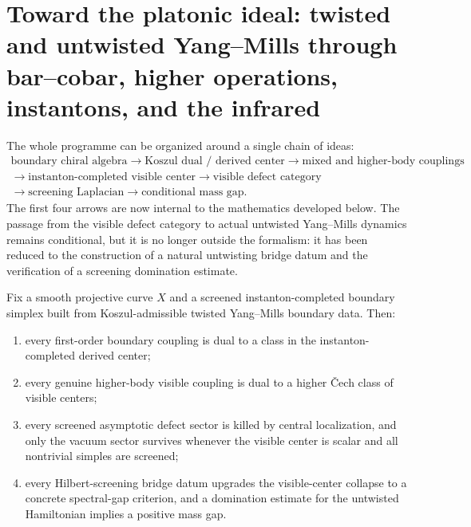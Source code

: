 \providecommand{\cH}{\mathcal{H}}
\providecommand{\cB}{\mathcal{B}}
\providecommand{\Barch}{\overline{B}^{\mathrm{ch}}}

\section{Toward the platonic ideal: twisted and untwisted Yang--Mills through bar--cobar, higher operations, instantons, and the infrared}
\label{sec:ym-instanton-ir-frontier}
\label{sec:ym-platonic-ideal-synthesis}

\begin{summary}
The whole programme can be organized around a single chain of ideas:
\begin{gather*}
\text{boundary chiral algebra}
\longrightarrow
\text{Koszul dual / derived center}
\longrightarrow
\text{mixed and higher-body couplings}\\
\longrightarrow
\text{instanton-completed visible center}
\longrightarrow
\text{visible defect category}\\
\longrightarrow
\text{screening Laplacian}
\longrightarrow
\text{conditional mass gap}.
\end{gather*}
The first four arrows are now internal to the mathematics developed below.
The passage from the visible defect category to actual untwisted Yang--Mills dynamics remains conditional,
but it is no longer outside the formalism: it has been reduced to the construction of a natural
untwisting bridge datum and the verification of a screening domination estimate.
\end{summary}

\begin{theorem}
\label{thm:grand-synthesis-principle}
Fix a smooth projective curve $X$ and a screened instanton-completed boundary simplex built from
Koszul-admissible twisted Yang--Mills boundary data.
Then:
\begin{enumerate}[label=(\roman*)]
\item every first-order boundary coupling is dual to a class in the instanton-completed derived center;
\item every genuine higher-body visible coupling is dual to a higher \v{C}ech class of visible centers;
\item every screened asymptotic defect sector is killed by central localization, and only the vacuum sector
survives whenever the visible center is scalar and all nontrivial simples are screened;
\item every Hilbert-screening bridge datum upgrades the visible-center collapse to a concrete spectral-gap criterion,
and a domination estimate for the untwisted Hamiltonian implies a positive mass gap.
\end{enumerate}
\end{theorem}

